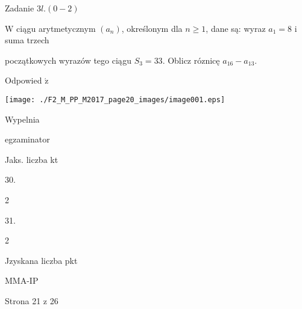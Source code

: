 \documentclass[a4paper,12pt]{article}
\begin{document}
Zadanie $3l. (0-2)$

$\mathrm{W}$ ciągu arytmetycznym $(a_{n})$, określonym dla $n\geq 1$, dane są: wyraz $a_{1}=8$ i suma trzech

początkowych wyrazów tego ciągu $S_{3}=33$. Oblicz róznicę $a_{16}-a_{13}.$

Odpowied $\acute{\mathrm{z}}$
\begin{center}
\texttt{[image: ./F2\_M\_PP\_M2017\_page20\_images/image001.eps]}
\end{center}
Wypelnia

egzaminator

Jaks. liczba kt

30.

2

31.

2

Jzyskana liczba pkt

MMA-IP

Strona 21 z 26
\end{document}
